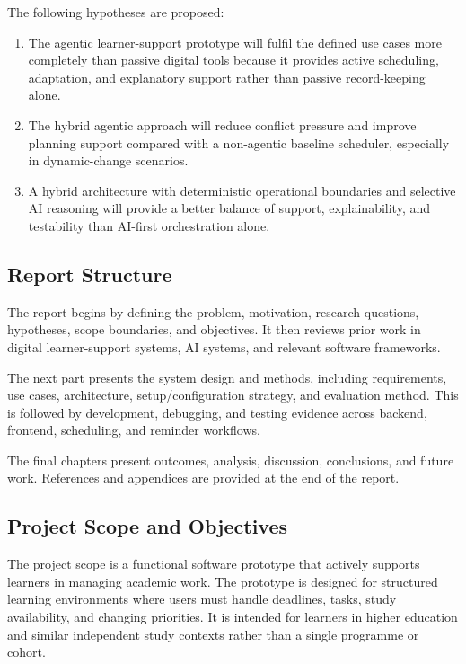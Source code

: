 \documentclass[12pt]{article}
\begin{document}
The following hypotheses are proposed:

\begin{enumerate}
    \item The agentic learner-support prototype will fulfil the defined use cases more completely than passive digital tools because it provides active scheduling, adaptation, and explanatory support rather than passive record-keeping alone.
    \item The hybrid agentic approach will reduce conflict pressure and improve planning support compared with a non-agentic baseline scheduler, especially in dynamic-change scenarios.
    \item A hybrid architecture with deterministic operational boundaries and selective AI reasoning will provide a better balance of support, explainability, and testability than AI-first orchestration alone.
\end{enumerate}

\subsection{Report Structure}
The report begins by defining the problem, motivation, research questions, hypotheses, scope boundaries, and objectives. It then reviews prior work in digital learner-support systems, AI systems, and relevant software frameworks.

The next part presents the system design and methods, including requirements, use cases, architecture, setup/configuration strategy, and evaluation method. This is followed by development, debugging, and testing evidence across backend, frontend, scheduling, and reminder workflows.

The final chapters present outcomes, analysis, discussion, conclusions, and future work. References and appendices are provided at the end of the report.



\subsection{Project Scope and Objectives}
\noindent The project scope is a functional software prototype that actively supports learners in managing academic work. The prototype is designed for structured learning environments where users must handle deadlines, tasks, study availability, and changing priorities. It is intended for learners in higher education and similar independent study contexts rather than a single programme or cohort.
\end{document}
